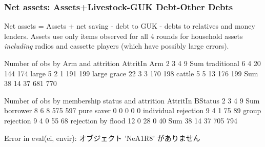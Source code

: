 
\subsubsection{Net assets: Assets+Livestock-GUK Debt-Other Debts}

Net assets = Assets + net saving - debt to GUK - debts to relatives and money lenders. Assets use only items observed for all 4 rounds for household assets \textit{including} radios and cassette players (which have possibly large errors). 


\begin{Schunk}
\begin{Soutput}


Number of obs by Arm and attrition
             AttritIn
Arm             2   3   4   9 Sum
  traditional   6   4  20 144 174
  large         5   2   1 191 199
  large grace  22   3   3 170 198
  cattle        5   5  13 176 199
  Sum          38  14  37 681 770


Number of obs by membership status and attrition
                      AttritIn
BStatus                  2   3   4   9 Sum
  borrower               8   6   8 575 597
  pure saver             0   0   0   0   0
  individual rejection   9   4   1  75  89
  group rejection        9   4   0  55  68
  rejection by flood    12   0  28   0  40
  Sum                   38  14  37 705 794
\end{Soutput}
\begin{Soutput}
Error in eval(ei, envir):  オブジェクト 'NeA1R8' がありません 
\end{Soutput}
\end{Schunk}




